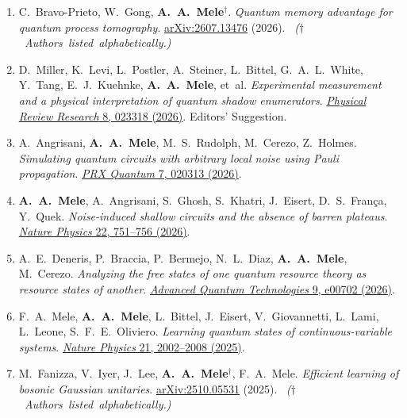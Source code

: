 \documentclass[11pt,a4paper]{article}
\newcommand{\cvpubitem}[1]{\item #1}
\newcommand{\authornote}[1]{%
  \unskip\ \mbox{\fontsize{9.5}{11.5}\selectfont\color{SoftGray}\textit{(#1)}}%
}
\begin{document}
\begin{enumerate}
\cvpubitem{C.~Bravo-Prieto, W.~Gong, \textbf{A.~A.~Mele}$^{\dagger}$.
\emph{Quantum memory advantage for quantum process tomography}.
\href{https://arxiv.org/abs/2607.13476}{arXiv:2607.13476} (2026).
\authornote{$\dagger$ Authors listed alphabetically.}}

\cvpubitem{D.~Miller, K.~Levi, L.~Postler, A.~Steiner, L.~Bittel, G.~A.~L.~White, Y.~Tang, E.~J.~Kuehnke, \textbf{A.~A.~Mele}, et~al.
\emph{Experimental measurement and a physical interpretation of quantum shadow enumerators}.
\href{https://doi.org/10.1103/8h3b-brg1}{\textit{Physical Review Research} 8, 023318 (2026)}. Editors' Suggestion.}

\cvpubitem{A.~Angrisani, \textbf{A.~A.~Mele}, M.~S.~Rudolph, M.~Cerezo, Z.~Holmes.
\emph{Simulating quantum circuits with arbitrary local noise using Pauli propagation}.
\href{https://doi.org/10.1103/fb28-wlv2}{\textit{PRX Quantum} 7, 020313 (2026)}.}

\cvpubitem{\textbf{A.~A.~Mele}, A.~Angrisani, S.~Ghosh, S.~Khatri, J.~Eisert, D.~S.~Fran\c{c}a, Y.~Quek.
\emph{Noise-induced shallow circuits and the absence of barren plateaus}.
\href{https://www.nature.com/articles/s41567-026-03245-z}{\textit{Nature Physics} 22, 751--756 (2026)}.}

\cvpubitem{A.~E.~Deneris, P.~Braccia, P.~Bermejo, N.~L.~Diaz, \textbf{A.~A.~Mele}, M.~Cerezo.
\emph{Analyzing the free states of one quantum resource theory as resource states of another}.
\href{https://doi.org/10.1002/qute.202500702}{\textit{Advanced Quantum Technologies} 9, e00702 (2026)}.}


\cvpubitem{F.~A.~Mele, \textbf{A.~A.~Mele}, L.~Bittel, J.~Eisert, V.~Giovannetti, L.~Lami, L.~Leone, S.~F.~E.~Oliviero.
\emph{Learning quantum states of continuous-variable systems}.
\href{https://www.nature.com/articles/s41567-025-03086-2}{\textit{Nature Physics} 21, 2002--2008 (2025)}.}

\cvpubitem{M.~Fanizza, V.~Iyer, J.~Lee, \textbf{A.~A.~Mele}$^{\dagger}$, F.~A.~Mele.
\emph{Efficient learning of bosonic Gaussian unitaries}.
\href{https://arxiv.org/abs/2510.05531}{arXiv:2510.05531} (2025).
\authornote{$\dagger$ Authors listed alphabetically.}}


\end{enumerate}
\end{document}
